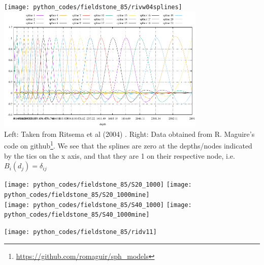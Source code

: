 \begin{center}
\texttt{[image: python\_codes/fieldstone\_85/rivw04splines]}
\includegraphics[width=10cm]{python_codes/fieldstone_85/splines/splines.pdf}\\
{\captionfont Left: Taken from Ritsema et al (2004) \cite{rivw04}.
Right: Data obtained from R. Maguire's code on github\footnote{\url{https://github.com/romaguir/sph_models}}.
We see that the splines are zero at the depths/nodes 
indicated by the tics on the x axis, and that 
they are 1 on their respective node, i.e. $B_i(d_j)=\delta_{ij}$}
\end{center}






\begin{center}
\texttt{[image: python\_codes/fieldstone\_85/S20\_1000]}
\texttt{[image: python\_codes/fieldstone\_85/S20\_1000mine]}\\
\texttt{[image: python\_codes/fieldstone\_85/S40\_1000]}
\texttt{[image: python\_codes/fieldstone\_85/S40\_1000mine]}\\
\end{center}



\texttt{[image: python\_codes/fieldstone\_85/ridv11]}


